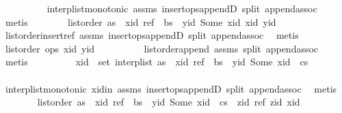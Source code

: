 \begin{isabellebody}
\ \ \ \ \ \ \ \ \isamarkupfalse%
\ interp{\isacharunderscore}list{\isacharunderscore}monotonic\ assms{\isacharparenleft}{}{\isacharparenright}\ insert{\isacharunderscore}ops{\isacharunderscore}appendD\ split\ append{\isachardot}assoc\ \isamarkupfalse%
\ metis\isanewline
\ \ \ \ \ \ \isamarkupfalse%
\ {\isachardoublequoteopen}list{\isacharunderscore}order\ {\isacharparenleft}as\ {\isacharat}\ {\isacharbrackleft}{\isacharparenleft}xid{\isacharcomma}\ ref{\isacharparenright}{\isacharbrackright}\ {\isacharat}\ bs\ {\isacharat}\ {\isacharbrackleft}{\isacharparenleft}yid{\isacharcomma}\ Some\ xid{\isacharparenright}{\isacharbrackright}{\isacharparenright}\ xid\ yid{\isachardoublequoteclose}\isanewline
\ \ \ \ \ \ \ \ \isamarkupfalse%
\ list{\isacharunderscore}order{\isacharunderscore}insert{\isacharunderscore}ref\ assms{\isacharparenleft}{}{\isacharparenright}\ insert{\isacharunderscore}ops{\isacharunderscore}appendD\ split\ append{\isachardot}assoc\ \isamarkupfalse%
\ metis\isanewline
\ \ \ \ \ \ \isamarkupfalse%
\ {\isachardoublequoteopen}list{\isacharunderscore}order\ ops\ xid\ yid{\isachardoublequoteclose}\isanewline
\ \ \ \ \ \ \ \ \isamarkupfalse%
\ list{\isacharunderscore}order{\isacharunderscore}append\ assms{\isacharparenleft}{}{\isacharparenright}\ split\ append{\isachardot}assoc\ \isamarkupfalse%
\ metis\isanewline
\ \ \ \ \ \ \isamarkupfalse%
\ \isamarkupfalse%
\ {\isachardoublequoteopen}xid\ {\isasymin}\ set\ {\isacharparenleft}interp{\isacharunderscore}list\ {\isacharparenleft}as\ {\isacharat}\ {\isacharbrackleft}{\isacharparenleft}xid{\isacharcomma}\ ref{\isacharparenright}{\isacharbrackright}\ {\isacharat}\ bs\ {\isacharat}\ {\isacharbrackleft}{\isacharparenleft}yid{\isacharcomma}\ Some\ xid{\isacharparenright}{\isacharbrackright}\ {\isacharat}\ cs{\isacharparenright}{\isacharparenright}{\isachardoublequoteclose}\isanewline
\ \ \ \ \ \ \ \ \isamarkupfalse%
\ interp{\isacharunderscore}list{\isacharunderscore}monotonic\ xid{\isacharunderscore}in\ assms{\isacharparenleft}{}{\isacharparenright}\ insert{\isacharunderscore}ops{\isacharunderscore}appendD\ split\ append{\isachardot}assoc\ \isamarkupfalse%
\ metis\isanewline
\ \ \ \ \ \ \isamarkupfalse%
\ {\isachardoublequoteopen}list{\isacharunderscore}order\ {\isacharparenleft}as\ {\isacharat}\ {\isacharbrackleft}{\isacharparenleft}xid{\isacharcomma}\ ref{\isacharparenright}{\isacharbrackright}\ {\isacharat}\ bs\ {\isacharat}\ {\isacharbrackleft}{\isacharparenleft}yid{\isacharcomma}\ Some\ xid{\isacharparenright}{\isacharbrackright}\ {\isacharat}\ cs\ {\isacharat}\ {\isacharbrackleft}{\isacharparenleft}zid{\isacharcomma}\ ref{\isacharparenright}{\isacharbrackright}{\isacharparenright}\ zid\ xid{\isachardoublequoteclose}\isanewline

\end{isabellebody}

